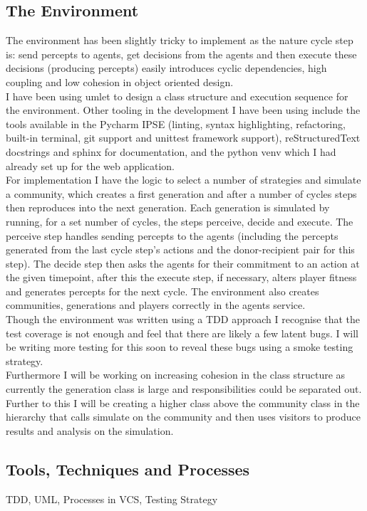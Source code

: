 \documentclass[]{final_report}
\begin{document}
\subsection{The Environment}
The environment has been slightly tricky to implement as the nature cycle step is: send percepts to agents, get decisions from the agents and then execute these decisions (producing percepts) easily introduces cyclic dependencies, high coupling and low cohesion in object oriented design.\\
I have been using umlet to design a class structure and execution sequence for the environment. Other tooling in the development I have been using include the tools available in the Pycharm IPSE (linting, syntax highlighting, refactoring, built-in terminal, git support and unittest framework support), reStructuredText docstrings and sphinx for documentation, and the python venv which I had already set up for the web application.\\
For implementation I have the logic to select a number of strategies and simulate a community, which creates a first generation and after a number of cycles steps then reproduces into the next generation. Each generation is simulated by running, for a set number of cycles, the steps perceive, decide and execute. The perceive step handles sending percepts to the agents (including the percepts generated from the last cycle step's actions and the donor-recipient pair for this step). The decide step then asks the agents for their commitment to an action at the given timepoint, after this the execute step, if necessary, alters player fitness and generates percepts for the next cycle. The environment also creates communities, generations and players correctly in the agents service.\\
Though the environment was written using a TDD approach I recognise that the test coverage is not enough and feel that there are likely a few latent bugs. I will be writing more testing for this soon to reveal these bugs using a smoke testing strategy. \\
Furthermore I will be working on increasing cohesion in the class structure as currently the generation class is large and responsibilities could be separated out. Further to this I will be creating a higher class above the community class in the hierarchy that calls simulate on the community and then uses visitors to produce results and analysis on the simulation.

\subsection{Tools, Techniques and Processes}
TDD, UML, Processes in VCS, Testing Strategy
\end{document}
